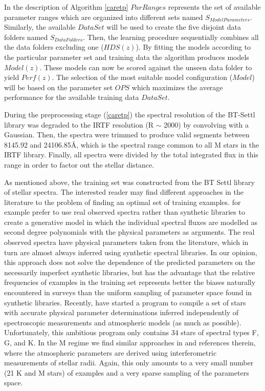 In the description of Algorithm \ref{caretp} $ParRanges$ represents
the set of available parameter ranges which are organized into
different sets named $S_{ModelParameters}$.  Similarly, the available
$DataSet$ will be used to create the five disjoint data folders named
$S_{DataFolders}$. Then, the learning procedure sequentially combines
all the data folders excluding one ($HDS(z)$).  By fitting the models
according to the particular parameter set and training data the
algorithm produces models $Model(z)$. These models can now be scored
against the unseen data folder to yield $Perf(z)$.  The selection of
the most suitable model configuration ($Model$) will be based on the
parameter set $OPS$ which maximizes the average performance for the
available training data $DataSet$.


During the preprocessing stage (\ref{caretp}) the
spectral resolution of the BT-Settl library was degraded to the IRTF
resolution (R $\sim$ 2000) by convolving with a Gaussian. Then, the spectra
were trimmed to produce valid segments between 8145.92 and
24106.85{\AA}, which is the spectral range common to all M stars in
the IRTF library. Finally, all spectra were divided by the total
integrated flux in this range in order to factor out the stellar
distance.

As mentioned above, the training set was constructed from the BT Settl
library of stellar spectra. The interested reader may find different
approaches in the literature to the problem of finding an optimal set
of training examples. \cite{hoggCannon} for example prefer to use real
observed spectra rather than synthetic libraries to create a
generative model in which the individual spectral fluxes are modelled
as second degree polynomials with the physical parameters as
arguments. The real observed spectra have physical parameters taken
from the literature, which in turn are almost always inferred using
synthetic spectral libraries. In our opinion, this approach does not
solve the dependence of the predicted parameters on the necessarily
imperfect synthetic libraries, but has the advantage that the relative
frequencies of examples in the training set represents better the
biases naturally encountered in surveys than the uniform sampling of
parameter space found in synthetic libraries. Recently, \cite{heiter}
have started a program to compile a set of stars with accurate
physical parameter determinations inferred independently of
spectroscopic measurements and atmospheric models (as much as
possible). Unfortunately, this ambitious program only contains 34
stars of spectral types F, G, and K. In the M regime we find similar
approaches in \cite{2014AJ....147...47B} and references therein, where
the atmospheric parameters are derived using interferometric
measurements of stellar radii. Again, this only amounts to a very
small number (21 K and M stars) of examples and a very sparse sampling
of the parameters space.

